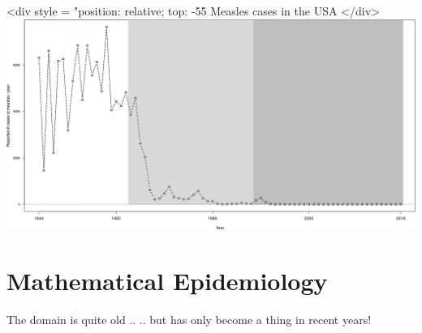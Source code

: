 \documentclass[aspectratio=43]{beamer}
\begin{document}
\begin{frame}
<div style = "position: relative; top: -55%
Measles cases in the USA
</div>
\includegraphics[width=\textwidth]{../FIGS/measles_US_1944_2019.png}
\end{frame}


\section{Mathematical Epidemiology}

\begin{frame}{The domain is quite old ..}
.. but has only become a thing in recent years!
\end{frame}

\end{document}
